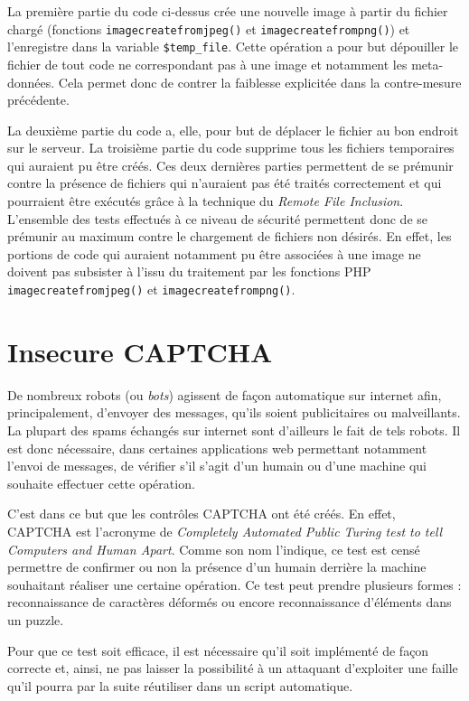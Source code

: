 La première partie du code ci-dessus crée une nouvelle image à partir du fichier chargé (fonctions \texttt{imagecreatefromjpeg()} et \texttt{imagecreatefrompng()}) et l'enregistre dans la variable \texttt{\$temp\_file}. Cette opération a pour but dépouiller le fichier de tout code ne correspondant pas à une image et notamment les meta-données. Cela permet donc de contrer la faiblesse explicitée dans la contre-mesure précédente.

La deuxième partie du code a, elle, pour but de déplacer le fichier au bon endroit sur le serveur. La troisième partie du code supprime tous les fichiers temporaires qui auraient pu être créés. Ces deux dernières parties permettent de se prémunir contre la présence de fichiers qui n'auraient pas été traités correctement et qui pourraient être exécutés grâce à la technique du \textit{Remote File Inclusion}.\\

L'ensemble des tests effectués à ce niveau de sécurité permettent donc de se prémunir au maximum contre le chargement de fichiers non désirés. En effet, les portions de code qui auraient notamment pu être associées à une image ne doivent pas subsister à l'issu du traitement par les fonctions PHP \texttt{imagecreatefromjpeg()} et \texttt{imagecreatefrompng()}.

\section{Insecure CAPTCHA}

De nombreux robots (ou \textit{bots}) agissent de façon automatique sur internet afin, principalement, d'envoyer des messages, qu'ils soient publicitaires ou malveillants. La plupart des spams échangés sur internet sont d'ailleurs le fait de tels robots. Il est donc nécessaire, dans certaines applications web permettant notamment l'envoi de messages, de vérifier s'il s'agit d'un humain ou d'une machine qui souhaite effectuer cette opération.

C'est dans ce but que les contrôles CAPTCHA ont été créés. En effet, CAPTCHA est l'acronyme de \textit{Completely Automated Public Turing test to tell Computers and Human Apart}. Comme son nom l'indique, ce test est censé permettre de confirmer ou non la présence d'un humain derrière la machine souhaitant réaliser une certaine opération. Ce test peut prendre plusieurs formes : reconnaissance de caractères déformés ou encore reconnaissance d'éléments dans un puzzle.

Pour que ce test soit efficace, il est nécessaire qu'il soit implémenté de façon correcte et, ainsi, ne pas laisser la possibilité à un attaquant d'exploiter une faille qu'il pourra par la suite réutiliser dans un script automatique.
 

